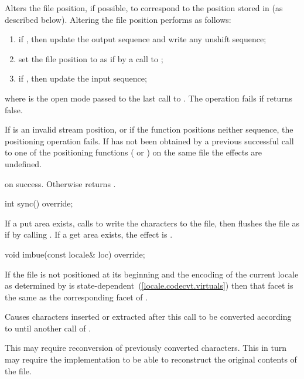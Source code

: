\begin{itemdescr}
\pnum
Alters the file position, if possible, to correspond to the position
stored in  (as described below).
Altering the file position performs as follows:
\begin{enumerate}
\item
if
,
then update the output sequence and
write any unshift sequence;
\item
set the file position to  as if by a call to ;
\item
if
,
then update the input sequence;
\end{enumerate}
where  is the open mode passed to the last call to
.
The operation fails if
returns false.

\pnum
If  is an invalid stream position, or if the function positions
neither sequence, the positioning operation fails.
If  has not been obtained by a previous successful call to one of
the positioning functions
(
or
)
on the same file the effects are undefined.

\pnum
\returns
{}
on success.
Otherwise returns
.
\end{itemdescr}

%
\begin{itemdecl}
int sync() override;
\end{itemdecl}

\begin{itemdescr}
\pnum
\effects
If a put area exists, calls
to write the characters to the file,
then flushes the file as if by calling .
If a get area exists, the effect is .
\end{itemdescr}

%
\begin{itemdecl}
void imbue(const locale& loc) override;
\end{itemdecl}

\begin{itemdescr}
\pnum
\precondition
If the file is not positioned at its beginning and the encoding of the current
locale as determined by
is state-dependent~(\ref{locale.codecvt.virtuals})
then that facet is the same as
the corresponding facet of .

\pnum
\effects
Causes characters inserted or extracted after this call
to be converted according to  until another call of
.

\pnum
\remark
This may require reconversion of previously converted characters.
This in turn may require the implementation to be able to reconstruct
the original contents of the file.
\end{itemdescr}

